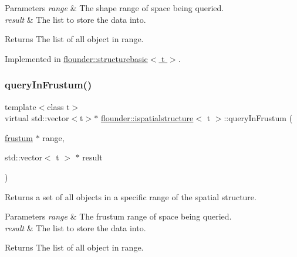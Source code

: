 \begin{DoxyParams}{Parameters}
{\em range} & The shape range of space being queried. \\
\hline
{\em result} & The list to store the data into. \\
\hline
\end{DoxyParams}
\begin{DoxyReturn}{Returns}
The list of all object in range. 
\end{DoxyReturn}


Implemented in \hyperlink{classflounder_1_1structurebasic_a977c80f9e4982f40afc5400714620a31}{flounder\+::structurebasic$<$ t $>$}.

\mbox{\label{classflounder_1_1ispatialstructure_aa27638201d27f6140a84c0e3c917f405}} 
\subsubsection{\texorpdfstring{query\+In\+Frustum()}{queryInFrustum()}}
{\footnotesize\ttfamily template$<$class t$>$ \\
virtual std\+::vector$<$t$>$$\ast$ \hyperlink{classflounder_1_1ispatialstructure}{flounder\+::ispatialstructure}$<$ t $>$\+::query\+In\+Frustum (\begin{DoxyParamCaption}\item[{\hyperlink{classflounder_1_1frustum}{frustum} $\ast$}]{range,  }\item[{std\+::vector$<$ t $>$ $\ast$}]{result }\end{DoxyParamCaption})\hspace{0.3cm}{\ttfamily [pure virtual]}}



Returns a set of all objects in a specific range of the spatial structure. 


\begin{DoxyParams}{Parameters}
{\em range} & The frustum range of space being queried. \\
\hline
{\em result} & The list to store the data into. \\
\hline
\end{DoxyParams}
\begin{DoxyReturn}{Returns}
The list of all object in range. 
\end{DoxyReturn}


